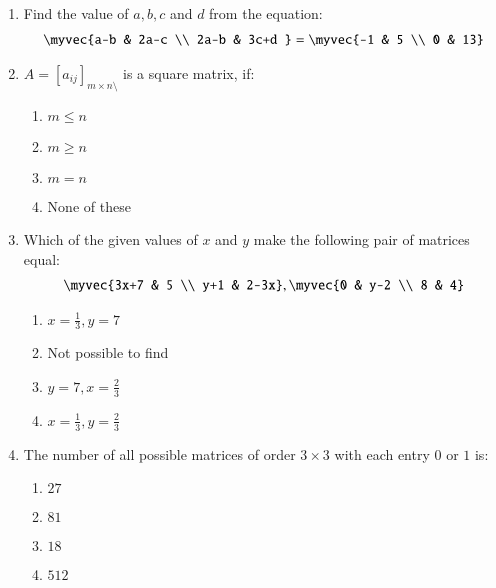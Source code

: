 \documentclass{article}
\theoremstyle{remark}
\begin{document}
\begin{enumerate}
\item Find the value of $a, b, c$ and $d$ from the equation:
\begin{align} \myvec 
{a-b & 2a-c \\ 2a-b &  3c+d } = 
\myvec{-1 & 5 \\ 0 & 13} \end{align}
\item $A=[a_{ij}]_{m\times n\setminus}$ is a square matrix, if:
\begin{enumerate}
\item $m \le n$
\item $m \ge n$
\item $m=n$
\item None of these
\end{enumerate}
\item Which of the given values of $x$ and $y$ make the following pair of matrices equal:
\begin{align} \myvec
{3x+7 & 5 \\ y+1 & 2-3x}, 
\myvec{0 & y-2 \\ 8 & 4}\end{align}
\begin{enumerate}
\item $x=, y=7$
\item Not possible to find 
\item $y=7, x=$
\item $x=, y=$
\end{enumerate}
\item The number of all possible matrices of order $3$ with each entry $0$ or $1$ is:
\begin{enumerate}
\item $27$
\item $81$
\item $18$
\item $512$
\end{enumerate}
\end{enumerate}
\end{document}
